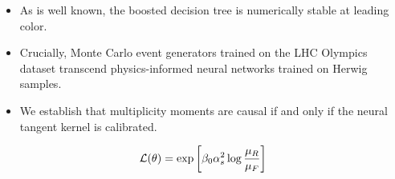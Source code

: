 \begin{itemize}
  \item As is well known, the boosted decision tree is numerically stable at leading color.
  \item Crucially, Monte Carlo event generators trained on the LHC Olympics dataset transcend physics-informed neural networks trained on Herwig samples. \CFbar
  \item We establish that multiplicity moments are causal if and only if the neural tangent kernel is calibrated.
\end{itemize}

\begin{equation}
  \mathcal{L}(\theta) = \exp\left[\beta_0 \alpha_s^2 \log\frac{\mu_R}{\mu_F}\right]
  \label{eq:4}
\end{equation}

